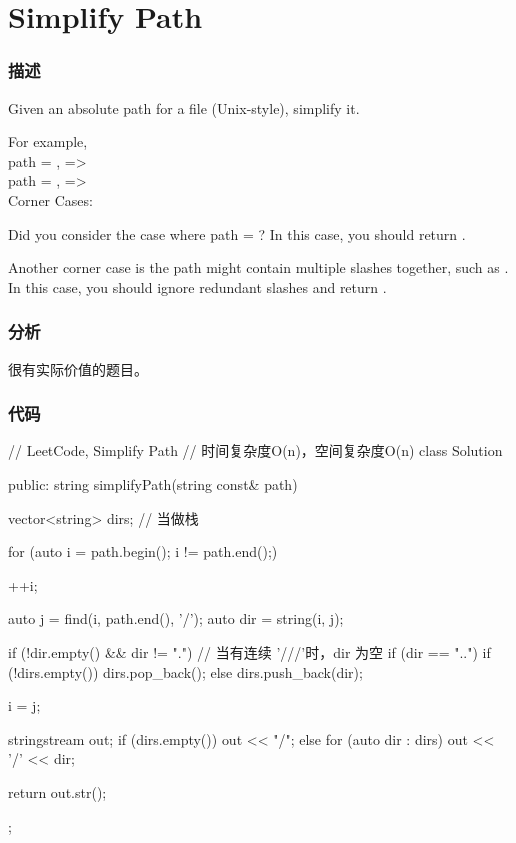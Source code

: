 \section{Simplify Path} %
\label{sec:simplify-path}


\subsubsection{描述}
Given an absolute path for a file (Unix-style), simplify it.

For example, \\
path = , =>  \\
path = , =>  \\

Corner Cases:
\begindot
\item Did you consider the case where path = ? 
In this case, you should return .
\item 
Another corner case is the path might contain multiple slashes  together, such as .
In this case, you should ignore redundant slashes and return .
\myenddot


\subsubsection{分析}
很有实际价值的题目。


\subsubsection{代码}
\begin{Code}
// LeetCode, Simplify Path
// 时间复杂度O(n)，空间复杂度O(n)
class Solution {
public:
    string simplifyPath(string const& path) {
        vector<string> dirs; // 当做栈

        for (auto i = path.begin(); i != path.end();) {
            ++i;

            auto j = find(i, path.end(), '/');
            auto dir = string(i, j);

            if (!dir.empty() && dir != ".") {// 当有连续 '///'时，dir 为空
                if (dir == "..") {
                    if (!dirs.empty())
                        dirs.pop_back();
                } else
                    dirs.push_back(dir);
            }

            i = j;
        }

        stringstream out;
        if (dirs.empty()) {
            out << "/";
        } else {
            for (auto dir : dirs)
                out << '/' << dir;
        }

        return out.str();
    }
};
\end{Code}


